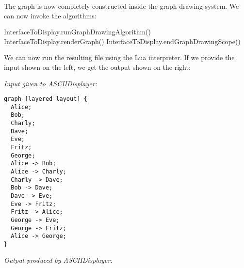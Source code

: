 \begin{codeexample}
\begin{codeexample}[code only]
for line in io.lines() do
  if line:match("}") then
    break
  elseif line:find("-") then
    local n1, dir, n2 = string.match(line, "^%
    InterfaceToDisplay.createEdge(n1, n2, dir, 4)
  else
    local n1 = string.match(line, "^%
    InterfaceToDisplay.createVertex(n1, "rectangle", nil, 4)
  end
end
\end{codeexample}

The graph is now completely constructed inside the graph drawing
system. We can now invoke the algorithms:

\begin{codeexample}
InterfaceToDisplay.runGraphDrawingAlgorithm()
InterfaceToDisplay.renderGraph()
InterfaceToDisplay.endGraphDrawingScope()
\end{codeexample}

We can now run the resulting file using the Lua interpreter. If we
provide the input shown on the left, we get the output shown on the
right:

\bigskip
\noindent
\begin{minipage}[t]{.5\textwidth}
\emph{Input given to ASCIIDisplayer:}  
  
\begin{verbatim}
graph [layered layout] {
  Alice;
  Bob;
  Charly;
  Dave;
  Eve;
  Fritz;
  George;
  Alice -> Bob;
  Alice -> Charly;
  Charly -> Dave;
  Bob -> Dave;
  Dave -> Eve;
  Eve -> Fritz;
  Fritz -> Alice;
  George -> Eve;
  George -> Fritz;
  Alice -> George;
}  
\end{verbatim}
\end{minipage}%
\begin{minipage}[t]{.49\textwidth}
\emph{Output produced by ASCIIDisplayer:}  
  

\end{minipage}
\end{codeexample}
